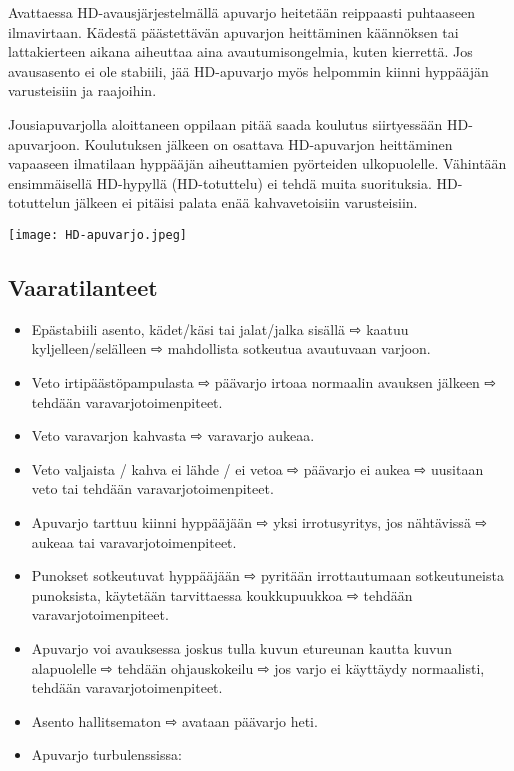 \begin{multicols}{2}
Avattaessa HD-avausjärjestelmällä apuvarjo heitetään reippaasti puhtaaseen ilmavirtaan. Kädestä päästettävän apuvarjon heittäminen käännöksen tai lattakierteen aikana aiheuttaa aina avautumisongelmia, kuten kierrettä. Jos avausasento ei ole stabiili, jää HD-apuvarjo myös helpommin kiinni hyppääjän varusteisiin ja raajoihin.  


Jousiapuvarjolla aloittaneen oppilaan pitää saada koulutus siirtyessään HD-apuvarjoon. Koulutuksen jälkeen on osattava HD-apuvarjon heittäminen vapaaseen ilmatilaan hyppääjän aiheuttamien pyörteiden ulkopuolelle. Vähintään ensimmäisellä HD-hypyllä (HD-totuttelu) ei tehdä muita suorituksia. HD-totuttelun jälkeen ei pitäisi palata enää kahvavetoisiin varusteisiin. 


\begin{Figure}\centering\texttt{[image: HD-apuvarjo.jpeg]}\end{Figure} 

\subsection{ Vaaratilanteet }
\label{hyppytapahtuma-vaaratilanteet}

\begin{itemize}
\item  Epästabiili asento, kädet/käsi tai jalat/jalka sisällä ⇨ kaatuu kyljelleen/selälleen ⇨ mahdollista sotkeutua avautuvaan varjoon. 
\item  Veto irtipäästöpampulasta ⇨ päävarjo irtoaa normaalin avauksen jälkeen ⇨ tehdään varavarjotoimenpiteet. 
\item  Veto varavarjon kahvasta ⇨ varavarjo aukeaa. 
\item  Veto valjaista / kahva ei lähde / ei vetoa ⇨ päävarjo ei aukea ⇨ uusitaan veto tai tehdään varavarjotoimenpiteet. 
\item  Apuvarjo tarttuu kiinni hyppääjään ⇨ yksi irrotusyritys, jos nähtävissä ⇨ aukeaa tai varavarjotoimenpiteet. 
\item  Punokset sotkeutuvat hyppääjään ⇨ pyritään irrottautumaan sotkeutuneista punoksista, käytetään tarvittaessa koukkupuukkoa ⇨ tehdään varavarjotoimenpiteet. 
\item  Apuvarjo voi avauksessa joskus tulla kuvun etureunan kautta kuvun alapuolelle ⇨ tehdään ohjauskokeilu ⇨ jos varjo ei käyttäydy normaalisti, tehdään varavarjotoimenpiteet.  
\item  Asento hallitsematon ⇨ avataan päävarjo heti. 
\item  Apuvarjo turbulenssissa: 
\end{itemize}


\end{multicols}

